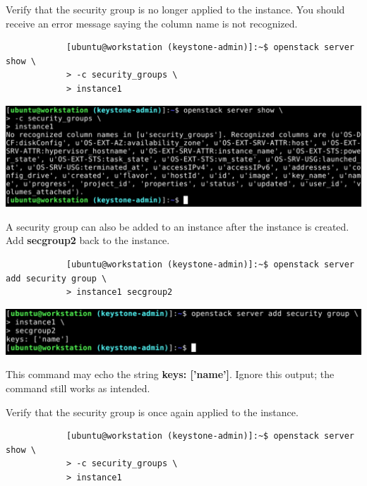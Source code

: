 \documentclass[letterpaper, 12pt]{article}
\begin{document}
\begin{enumerate}
    \begin{labstep}
        Verify that the security group is no longer applied to the instance.
        You should receive an error message saying the column name is not recognized.
        \begin{lstlisting}
            [ubuntu@workstation (keystone-admin)]:~$ openstack server show \
            > -c security_groups \
            > instance1
        \end{lstlisting}

        \begin{center}
            \includegraphics[width=\linewidth]{images/part2/step5.png}
        \end{center}
    \end{labstep}

    \begin{labstep}
        A security group can also be added to an instance after the instance is created.
        Add \textbf{secgroup2} back to the instance.
        \begin{lstlisting}
            [ubuntu@workstation (keystone-admin)]:~$ openstack server add security group \
            > instance1 secgroup2
        \end{lstlisting}

        \begin{center}
            \includegraphics[width=\linewidth]{images/part2/step6.png}
        \end{center}
    \end{labstep}

    \begin{notebox}
        This command may echo the string \textbf{keys: ['name']}.
        Ignore this output; the command still works as intended.
    \end{notebox}

    \begin{labstep}
        Verify that the security group is once again applied to the instance.
        \begin{lstlisting}
            [ubuntu@workstation (keystone-admin)]:~$ openstack server show \
            > -c security_groups \
            > instance1
        \end{lstlisting}


\end{labstep}
\end{enumerate}
\end{document}
